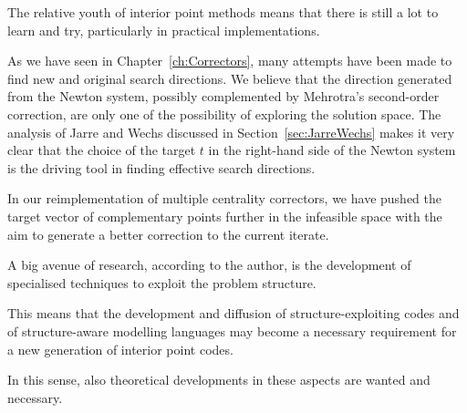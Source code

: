 
%
%
\label{ch:Conclusions}

The relative youth of interior point methods means that there is still
a lot to learn and try, particularly in practical implementations.

As we have seen in Chapter~\ref{ch:Correctors}, many attempts
have been made to find new and original search directions.
We believe that the direction generated from the Newton system,
possibly complemented by Mehrotra's second-order correction,
are only one of the possibility of exploring the solution space.
The analysis of Jarre and Wechs discussed in Section~\ref{sec:JarreWechs}
makes it very clear that the choice of the target $t$ in
the right-hand side of the Newton system is the driving
tool in finding effective search directions.

In our reimplementation of multiple centrality correctors, we
have pushed the target vector of complementary points further
in the infeasible space with the aim to generate a better
correction to the current iterate.

A big avenue of research, according to the author, is the development
of specialised techniques to exploit the problem structure.

This means that the development and diffusion of structure-exploiting
codes and of structure-aware modelling languages may become a necessary
requirement for a new generation of interior point codes.

In this sense, also theoretical developments in these aspects are 
wanted and necessary.
